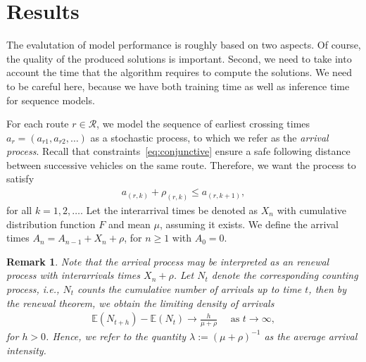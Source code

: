 \documentclass[a4paper]{report}
\theoremstyle{definition}
\theoremstyle{plain}
\newtheorem{remark}{Remark}[chapter]
\begin{document}
\section{Results}\label{sec:results}

The evalutation of model performance is roughly based on two aspects. Of course,
the quality of the produced solutions is important. Second, we need to take into
account the time that the algorithm requires to compute the solutions. We need
to be careful here, because we have both training time as well as inference
time for sequence models.


For each route $r \in \mathcal{R}$, we model the sequence of earliest crossing times
$a_{r} = (a_{r1}, a_{r2}, \dots)$ as a stochastic process, to which we refer as
the \textit{arrival process}. Recall that constraints~\eqref{eq:conjunctive}
ensure a safe following distance between successive vehicles on the same route.
Therefore, we want the process to satisfy
\begin{align*}
  a_{(r, k)} + \rho_{(r,k)} \leq a_{(r, k + 1)} ,
\end{align*}
for all $k = 1, 2, \dots$.
%
Let the interarrival times be denoted as $X_{n}$ with cumulative distribution
function $F$ and mean $\mu$, assuming it exists. We define the arrival times
$A_{n} = A_{n-1} + X_{n} + \rho$, for $n \geq 1$ with $A_{0} = 0$.

\begin{remark}
Note that the arrival process may be interpreted as an renewal process with interarrivals
times $X_{n} + \rho$.
%
%
Let $N_{t}$ denote the corresponding counting process, i.e., $N_{t}$ counts the
cumulative number of arrivals up to time $t$, then by the \textit{renewal theorem}, we
obtain the \textit{limiting density} of arrivals
%
\begin{align*}
  \mathbb{E}(N_{t + h}) - \mathbb{E}(N_{t}) \rightarrow \frac{h}{\mu + \rho} \quad \text{ as } t \rightarrow \infty ,
\end{align*}
for $h > 0$. Hence, we refer to the quantity $\lambda := {(\mu + \rho)}^{-1}$ as the
average arrival intensity.
\end{remark}
\end{document}
